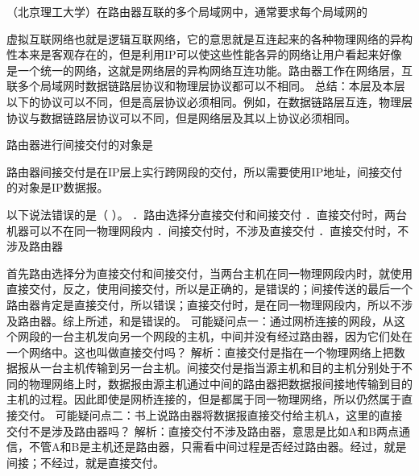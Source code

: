\question （北京理工大学）在路由器互联的多个局域网中，通常要求每个局域网的
\par{}
\begin{solution}虚拟互联网络也就是逻辑互联网络，它的意思就是互连起来的各种物理网络的异构性本来是客观存在的，但是利用IP可以使这些性能各异的网络让用户看起来好像是一个统一的网络，这就是网络层的异构网络互连功能。路由器工作在网络层，互联多个局域网时数据链路层协议和物理层协议都可以不相同。
总结：本层及本层以下的协议可以不同，但是高层协议必须相同。例如，在数据链路层互连，物理层协议与数据链路层协议可以不同，但是网络层及其以上协议必须相同。
\end{solution}
\question 路由器进行间接交付的对象是
\par{}
\begin{solution}路由器间接交付是在IP层上实行跨网段的交付，所以需要使用IP地址，间接交付的对象是IP数据报。
\end{solution}
\question 以下说法错误的是（ ）。 ．路由选择分直接交付和间接交付
．直接交付时，两台机器可以不在同一物理网段内
．间接交付时，不涉及直接交付 ．直接交付时，不涉及路由器
\par{}
\begin{solution}首先路由选择分为直接交付和间接交付，当两台主机在同一物理网段内时，就使用直接交付，反之，使用间接交付，所以是正确的，是错误的；间接传送的最后一个路由器肯定是直接交付，所以错误；直接交付时，是在同一物理网段内，所以不涉及路由器。综上所述，和是错误的。
可能疑问点一：通过网桥连接的网段，从这个网段的一台主机发向另一个网段的主机，中间并没有经过路由器，因为它们处在一个网络中。这也叫做直接交付吗？
解析：直接交付是指在一个物理网络上把数据报从一台主机传输到另一台主机。间接交付是指当源主机和目的主机分别处于不同的物理网络上时，数据报由源主机通过中间的路由器把数据报间接地传输到目的主机的过程。因此即使是网桥连接的，但是都属于同一物理网络，所以仍然属于直接交付。
可能疑问点二：书上说路由器将数据报直接交付给主机A，这里的直接交付不是涉及路由器吗？
解析：直接交付不涉及路由器，意思是比如A和B两点通信，不管A和B是主机还是路由器，只需看中间过程是否经过路由器。经过，就是间接；不经过，就是直接交付。
\end{solution}
